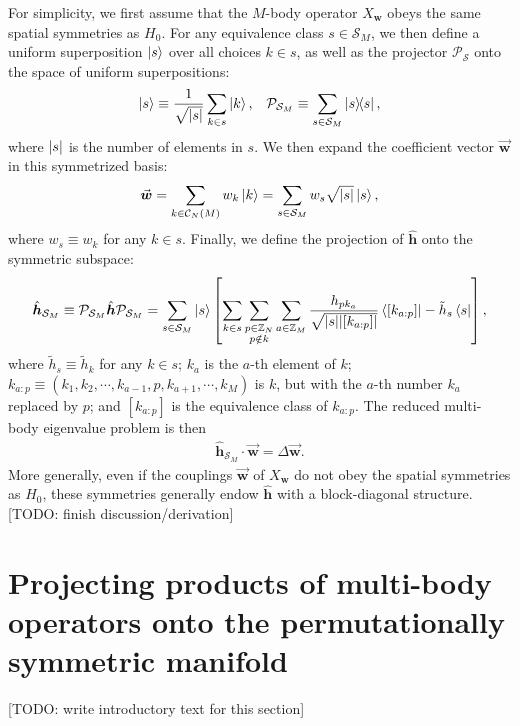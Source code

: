 \documentclass[nofootinbib,notitlepage,11pt]{revtex4-2}
\newcommand{\f}[2]{\dfrac{#1}{#2}} %
\newcommand{\p}[1]{\left(#1\right)} %
\renewcommand{\sp}[1]{\left[#1\right]} %
\renewcommand{\c}{\cdot} %
\newcommand{\m}{\bm} %
\renewcommand{\v}{\vec} %
\newcommand{\1}{\mathds{1}}
\newcommand{\C}{\mathcal{C}}
\renewcommand{\P}{\mathcal{P}}
\renewcommand{\S}{\mathcal{S}}
\newcommand{\ZZ}{\mathbb{Z}}
\newcommand{\red}[1]{{\color{red} #1}}
\begin{document}
For simplicity, we first assume that the $M$-body operator $X_{\m w}$
obeys the same spatial symmetries as $H_0$.  For any equivalence class
$s\in\S_M$, we then define a uniform superposition $\ket{s}$ over all
choices $k\in s$, as well as the projector $\P_\S$ onto the space of
uniform superpositions:
\begin{align}
  \ket{s} \equiv \f1{\sqrt{\abs{s}}} \sum_{k\in s} \ket{k},
  &&
  \P_{\S_M} \equiv \sum_{s\in\S_M} \op{s},
\end{align}
where $\abs{s}$ is the number of elements in $s$.  We then expand the
coefficient vector $\v{\m w}$ in this symmetrized basis:
\begin{align}
  \v{\m w} = \sum_{k\in\C_N\p{M}} w_k \ket{k}
  = \sum_{s\in\S_M} w_s \sqrt{\abs{s}} \ket{s},
\end{align}
where $w_s\equiv w_k$ for any $k\in s$.  Finally, we define the
projection of $\hat{\m h}$ onto the symmetric subspace:
\begin{align}
  \hat{\m h}_{\S_M}
  \equiv \P_{\S_M} \hat{\m h} \P_{\S_M}
  = \sum_{s\in\S_M} \ket{s} \sp{
    \sum_{k\in s} \sum_{\substack{p\in\ZZ_N\\p\notin k}} \sum_{a\in\ZZ_M}
    \f{h_{p k_a}}{\sqrt{\abs{s}\abs{\sp{k_{a:p}}}}} \bra{\sp{k_{a:p}}}
    - \tilde h_s \bra{s}},
\end{align}
where $\tilde h_s\equiv \tilde h_k$ for any $k\in s$; $k_a$ is the
$a$-th element of $k$;
$k_{a:p}\equiv\p{k_1,k_2,\cdots,k_{a-1},p,k_{a+1},\cdots,k_M}$ is $k$,
but with the $a$-th number $k_a$ replaced by $p$; and $\sp{k_{a:p}}$
is the equivalence class of $k_{a:p}$.  The reduced multi-body
eigenvalue problem is then
\begin{align}
  \hat{\m h}_{\S_M} \c \v{\m w} = \Delta \v{\m w}.
\end{align}
More generally, even if the couplings $\v{\m w}$ of $X_{\m w}$ do not
obey the spatial symmetries as $H_0$, these symmetries generally endow
$\hat{\m h}$ with a block-diagonal structure. \red{[TODO: finish
  discussion/derivation]}

\section{Projecting products of multi-body operators onto the
  permutationally symmetric manifold}
\label{sec:operator_product}

\red{[TODO: write introductory text for this section]}
\end{document}
